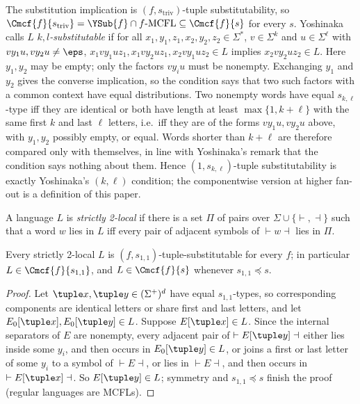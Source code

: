 The substitution implication is $(f,s_{\mathrm{triv}})$-tuple substitutability,
so $\Cmcf{f}{s_{\mathrm{triv}}}=\YSub{f}\cap f\text{-}\mathrm{MCFL}\subseteq\Cmcf{f}{s}$
for every $s$.  Yoshinaka \cite[Definition~2]{Yoshinaka2008} calls $L$
\emph{$k,l$-substitutable} if for all $x_1,y_1,z_1,x_2,y_2,z_2\in\Sigma^*$,
$v\in\Sigma^k$ and $u\in\Sigma^\ell$ with $vy_1u,vy_2u\ne\eps$,
$x_1vy_1uz_1,x_1vy_2uz_1,x_2vy_1uz_2\in L$ implies $x_2vy_2uz_2\in L$.  Here
$y_1,y_2$ may be empty; only the factors $vy_iu$ must be nonempty.  Exchanging
$y_1$ and $y_2$ gives the converse implication, so the condition says that two
such factors with a common context have equal distributions.  Two nonempty words
have equal $s_{k,\ell}$-type iff they are identical or both have length at least
$\max\{1,k+\ell\}$ with the same first $k$ and last $\ell$ letters, i.e.\ iff they
are of the forms $vy_1u,vy_2u$ above, with $y_1,y_2$ possibly empty, or equal.
Words shorter than $k+\ell$ are therefore compared only with themselves, in line
with Yoshinaka's remark that the condition says nothing about them.  Hence
$(1,s_{k,\ell})$-tuple substitutability is exactly Yoshinaka's $(k,\ell)$
condition; the componentwise version at higher fan-out is a definition of this
paper.

A language $L$ is \emph{strictly 2-local} if there is a set $\Pi$ of pairs over
$\Sigma\cup\{\vdash,\dashv\}$ such that a word $w$ lies in $L$ iff every pair of
adjacent symbols of $\vdash w\dashv$ lies in $\Pi$.

\begin{lemma}
\label{lem:sl2-boundary-control}
Every strictly 2-local $L$ is $(f,s_{1,1})$-tuple-substitutable for every $f$; in
particular $L\in\Cmcf{f}{s_{1,1}}$, and $L\in\Cmcf{f}{s}$ whenever $s_{1,1}\preceq s$.
\end{lemma}

\begin{proof}
Let $\tuple x,\tuple y\in(\Sigma^+)^d$ have equal $s_{1,1}$-types, so
corresponding components are identical letters or share first and last letters,
and let $E_0[\tuple x],E_0[\tuple y]\in L$.  Suppose $E[\tuple x]\in L$.  Since the
internal separators of $E$ are nonempty, every adjacent pair of
$\vdash E[\tuple y]\dashv$ either lies inside some $y_i$, and then occurs in
$E_0[\tuple y]\in L$, or joins a first or last letter of some $y_i$ to a symbol of
$\vdash E\dashv$, or lies in $\vdash E\dashv$, and then occurs in
$\vdash E[\tuple x]\dashv$.  So $E[\tuple y]\in L$; symmetry and $s_{1,1}\preceq s$
finish the proof (regular languages are MCFLs).
\end{proof}

